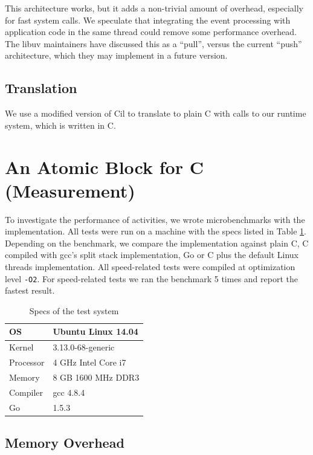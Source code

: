 \documentclass[acmsmall,anonymous,review]{acmart}\settopmatter{printfolios=true,printccs=false,printacmref=false}
\begin{document}
This architecture works, but it adds a non-trivial amount of overhead, especially for fast system calls.
We speculate that integrating the event processing with application code in the same thread could remove some performance overhead.
The libuv maintainers have discussed this as a ``pull'', versus the current ``push'' architecture, which they may implement in a future version.

\subsection{Translation}

We use a modified version of Cil \cite{Necula2002} to translate \charcoal{} to plain C with calls to our runtime system, which is written in C.

\section{An Atomic Block for C (Measurement)}

To investigate the performance of activities, we wrote microbenchmarks with the \charcoal{} implementation.
All tests were run on a machine with the specs listed in Table \ref{table:specs}.
Depending on the benchmark, we compare the \charcoal{} implementation against plain C, C compiled with gcc's split stack implementation, Go or C plus the default Linux threads implementation.
All speed-related tests were compiled at optimization level \texttt{-O2}.
For speed-related tests we ran the benchmark 5 times and report the fastest result.

\begin{table}
  \centering
  \begin{tabular}{|l|l|}
    \hline
    OS & Ubuntu Linux 14.04 \\
    \hline
    Kernel & 3.13.0-68-generic \\
    \hline
    Processor & 4 GHz Intel Core i7 \\
    \hline
    Memory & 8 GB 1600 MHz DDR3 \\
    \hline
    Compiler & gcc 4.8.4 \\
    \hline
    Go & 1.5.3 \\
    \hline
  \end{tabular}
  \caption{Specs of the test system}
  \label{table:specs}
\end{table}

\subsection{Memory Overhead}
\end{document}
